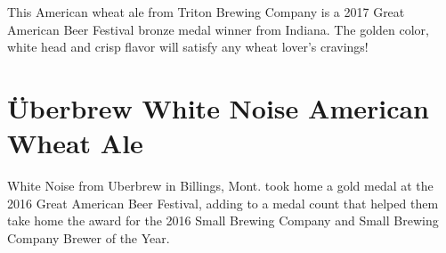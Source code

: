 \documentclass[10pt,oneside]{scrbook}
\begin{document}
\begin{aboutblock}
This American wheat ale from Triton Brewing Company is a 2017 Great American
Beer Festival bronze medal winner from Indiana. The golden color, white head
and crisp flavor will satisfy any wheat lover's cravings!
\end{aboutblock}


\begin{methodandtiming}
 
\begin{mashsteps}
\end{mashsteps}

\begin{fermentationsteps}
\end{fermentationsteps}

\end{methodandtiming}

\pagebreak

\begin{ingredientsblock}

\begin{malts}
\end{malts}

\begin{hops}
\end{hops}

\begin{yeasts}
\end{yeasts}

\end{ingredientsblock}


\chapter*{Überbrew White Noise American Wheat Ale}

\begin{aboutblock}
White Noise from Uberbrew in Billings, Mont. took home a gold medal at the 2016
Great American Beer Festival, adding to a medal count that helped them take home
the award for the 2016 Small Brewing Company and Small Brewing Company Brewer of
the Year.
\end{aboutblock}
\end{document}
